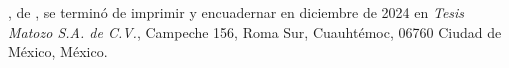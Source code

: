 \newpage

\vspace*{\fill}

\begin{center}
	\parbox{200pt}{\centering
		\newthought{\thetitle}, de \theauthor, se terminó de imprimir y encuadernar en diciembre de 2024 en \emph{Tesis Matozo S.A. de C.V.}, Campeche 156, Roma Sur, Cuauhtémoc, 06760 Ciudad de México, México.
	}
\end{center}

\vspace*{\fill}
